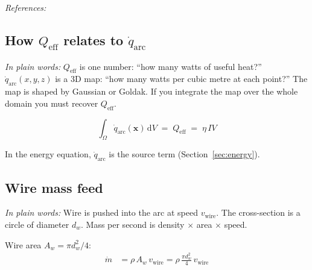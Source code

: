 \documentclass[11pt,a4paper]{article}
\newcommand{\dd}{\mathrm{d}}
\newcommand{\vect}[1]{\mathbf{#1}}
\newcommand{\fref}[1]{\par\smallskip\noindent\textit{References:} #1\par}
\newcommand{\newbie}[1]{\par\medskip\noindent\textit{In plain words:} #1\par\medskip}
\begin{document}
\fref{\cite{Kou2003,Incropera2007,Radaj2003}}

\subsection{How $Q_{\mathrm{eff}}$ relates to $\dot{q}_{\mathrm{arc}}$}
\label{sec:qarc-vs-qeff}

\newbie{$Q_{\mathrm{eff}}$ is one number: ``how many watts of useful heat?''
$\dot{q}_{\mathrm{arc}}(x,y,z)$ is a 3D map: ``how many watts per cubic metre
at each point?'' The map is shaped by Gaussian or Goldak. If you integrate the
map over the whole domain you must recover $Q_{\mathrm{eff}}$.}

\begin{equation}
  \int_{\Omega} \dot{q}_{\mathrm{arc}}(\vect{x})\,\dd V
  \;=\; Q_{\mathrm{eff}} \;=\; \eta\, IV
  \label{eq:qarc-integral}
\end{equation}

\begin{center}
\end{center}

In the energy equation, $\dot{q}_{\mathrm{arc}}$ is the source term (Section~\ref{sec:energy}).

\subsection{Wire mass feed}
\newbie{Wire is pushed into the arc at speed $v_{\mathrm{wire}}$. The cross-section
is a circle of diameter $d_w$. Mass per second is density $\times$ area $\times$ speed.}

Wire area $A_w = \pi d_w^2/4$:
\begin{align}
  \dot{m} &= \rho\, A_w\, v_{\mathrm{wire}}
           = \rho\,\frac{\pi d_w^2}{4}\, v_{\mathrm{wire}} \label{eq:mdot}
\end{align}
\end{document}
